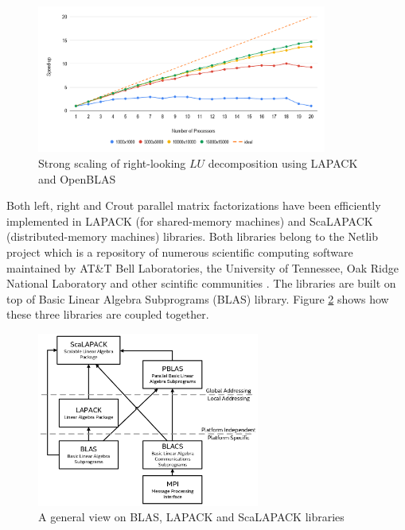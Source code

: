 \begin{figure}[htpb]
  \centering
  \includegraphics[width=0.85\textwidth]{figures/chapter-2/lapack-lu-strong-scaling.png}
\caption{Strong scaling of right-looking $LU$ decomposition using LAPACK and OpenBLAS}
\label{fig:lapack-lu-strong-scaling}
\end{figure}


Both left, right and Crout parallel matrix factorizations have been efficiently implemented in LAPACK (for shared-memory machines) and ScaLAPACK (distributed-memory machines) libraries. Both libraries belong to the Netlib project which is a repository of numerous scientific computing software maintained by AT\&T Bell Laboratories, the University of Tennessee, Oak Ridge National Laboratory and other scintific communities \cite{netlib-overview}. The libraries are built on top of Basic Linear Algebra Subprograms (BLAS) library. Figure \ref{fig:blas-lapack-scalapack} shows how these three libraries are coupled together.\\

\begin{figure}[htpb]
  \centering
  \includegraphics[width=0.65\textwidth]{figures/chapter-2/lapack-scalapack-blas.png}
\caption{A general view on BLAS, LAPACK and ScaLAPACK libraries \cite{netlib:lapack-scalapack-general-view}}
\label{fig:blas-lapack-scalapack}
\end{figure}

